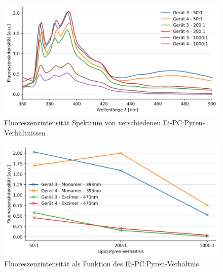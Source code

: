 \begin{figure}[h!]
	\begin{center}
		\begin{minipage}{0,8\textwidth}
			
			\includegraphics[width=\textwidth]{picture/Konz.png}
			\caption{Fluoreszenzintensität Spektrum von verschiedenen Ei-PC:Pyren-Verhältnissen} 
			\label{Konz_Scan} 
		\end{minipage}
	\end{center}
\end{figure}

\begin{figure}[h!]
	\begin{center}
		\begin{minipage}{0,8\textwidth}
			
			\includegraphics[width=\textwidth]{analysis/reports/Konz_Verh.png}
			\caption{Fluoreszenzintensität als Funktion des Ei-PC:Pyren-Verhältnis} 
			\label{Konz_Verh} 
		\end{minipage}
	\end{center}
\end{figure}
\vspace*{3.4cm}


